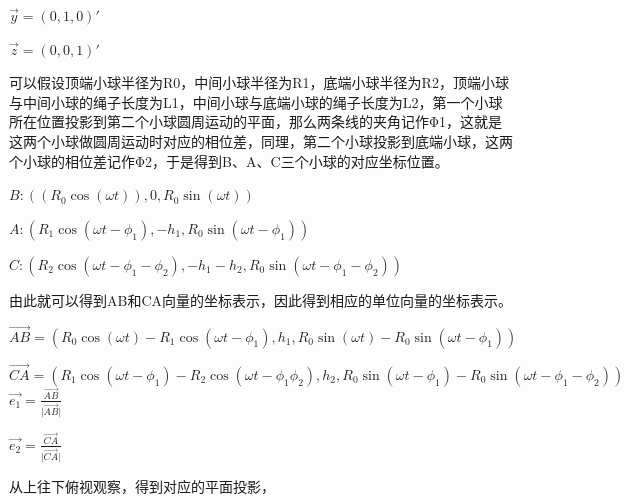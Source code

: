 \documentclass[12pt,a4paper]{ctexart}
\begin{document}
	$\vec{y}=(0,1,0)'$
	
	$\vec{z}=(0,0,1)'$
	
	可以假设顶端小球半径为R0，中间小球半径为R1，底端小球半径为R2，顶端小球与中间小球的绳子长度为L1，中间小球与底端小球的绳子长度为L2，第一个小球所在位置投影到第二个小球圆周运动的平面，那么两条线的夹角记作Φ1，这就是这两个小球做圆周运动时对应的相位差，同理，第二个小球投影到底端小球，这两个小球的相位差记作Φ2，于是得到B、A、C三个小球的对应坐标位置。
	
	$B:((R_0\cos{(\omega t)}),0,R_0\sin{(\omega t)})$
	
	$A:(R_1\cos{(\omega t-\phi_1)},-h_1,R_0\sin{(\omega t-\phi_1)})$
	
	$C:(R_2\cos{(\omega t-\phi_1-\phi_2)},-h_1-h_2,R_0\sin{(\omega t-\phi_1-\phi_2)})$
	
	由此就可以得到AB和CA向量的坐标表示，因此得到相应的单位向量的坐标表示。
	
	$\vec{AB}=(R_0\cos{(\omega t)}-R_1\cos{(\omega t-\phi_1)},h_1,R_0\sin{(\omega t)}-R_0\sin{(\omega t-\phi_1)})$
	
	$\vec{CA}=(R_1\cos{(\omega t-\phi_1)}-R_2\cos{(\omega t-\phi_1\phi_2)},h_2,R_0\sin{(\omega t-\phi_1)}-R_0\sin{(\omega t-\phi_1-\phi_2)})$
	\clearpage
	\thispagestyle{empty}
	$\vec{e_1}=\frac{\vec{AB}}{\vert\vec{AB}\vert}$

	$\vec{e_2}=\frac{\vec{CA}}{\vert\vec{CA}\vert}$
	
	从上往下俯视观察，得到对应的平面投影，
		\textbf{}\
	
	
	
	
\end{document}
